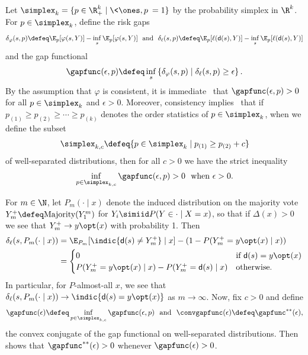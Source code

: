 \documentclass[11pt]{article}
\newcommand{\pred}{\mathsf{d}}  %
\newcommand{\tloss}{\ell}  %
\newcommand{\sloss}{\varphi}  %
\newcommand{\extloss}{\delta_\tloss}
\newcommand{\exsloss}{\delta_\sloss}
\begin{document}
Let $\simplex_k = \{p \in \R^k_+ \mid \<\ones, p\> = 1\}$ by the probability
simplex in $\R^k$.
%
For $p \in \simplex_k$, define the risk gaps
\begin{equation*}
  \exsloss(s, p) \defeq
  \E_p[\sloss(s, Y)] - \inf_s \E_p[\sloss(s, Y)]
  ~~ \mbox{and} ~~
  \extloss(s, p) \defeq
  \E_p[\tloss(\pred(s), Y)]
  - \inf_s \E_p[\tloss(\pred(s), Y)]
\end{equation*}
and the gap functional
\begin{equation*}
  \gapfunc(\epsilon, p)
  \defeq \inf_s \left\{\exsloss(s, p) \mid \extloss(s, p) \ge \epsilon\right\}.
\end{equation*}
By the assumption that $\sloss$ is consistent, it is
immediate~\citep{Steinwart07} that $\gapfunc(\epsilon, p) > 0$ for all $p \in
\simplex_k$ and $\epsilon > 0$.
%
Moreover, consistency implies~\citep{Zhang04a} that if
$p_{(1)} \ge p_{(2)} \ge \cdots \ge p_{(k)}$ denotes the order
statistics of $p \in \simplex_k$, when we define the subset
\begin{equation*}
  \simplex_{k,c}
  \defeq \{p \in \simplex_k
  \mid p_{(1)} \ge p_{(2)} + c \}
\end{equation*}
of well-separated distributions, then for all $c > 0$ we have
the strict inequality
\begin{equation*}
  \inf_{p \in \simplex_{k,c}} \gapfunc(\epsilon, p) > 0
  ~~ \mbox{when}~ \epsilon > 0.
\end{equation*}

For $m \in \N$, let $P_m(\cdot \mid x)$ denote the
induced distribution on the majority vote $Y_m^+ \defeq
\mbox{Majority}(Y_1^m)$ for $Y_i \simiid P(Y \in \cdot \mid X = x)$,
so that if $\Delta(x) > 0$ we see that
$Y_m^+ \to y\opt(x)$ with probability 1.
%
Then
\begin{align*}
  \extloss(s, P_m(\cdot \mid x))
  & = \E_{P_m}[\indic{\pred(s) \neq Y_m^+} \mid x]
  - (1 - P(Y_m^+ = y\opt(x) \mid x)) \\
  & = \begin{cases}
    0 & \mbox{if}~ \pred(s) = y\opt(x) \\
    P(Y_m^+ = y\opt(x) \mid x) - P(Y_m^+ = \pred(s) \mid x)
    & \mbox{otherwise}.
  \end{cases}
\end{align*}
In particular, for $P$-almost-all $x$, we see that
$\extloss(s, P_m(\cdot \mid x)) \to \indic{\pred(s) = y\opt(x)}$
as $m \to \infty$.
%
Now, fix $c > 0$ and define
\begin{equation*}
  \gapfunc(\epsilon) \defeq
  \inf_{p \in \simplex_{k,c}} \gapfunc(\epsilon, p)
  ~~ \mbox{and} ~~
  \convgapfunc(\epsilon) \defeq
  \gapfunc^{**}(\epsilon),
\end{equation*}
the convex conjugate of the gap functional on well-separated
distributions.
%
Then~\citet[Prop.~25]{Zhang04a} shows that $\gapfunc^{**}(\epsilon) > 0$
whenever $\gapfunc(\epsilon) > 0$.
\end{document}

